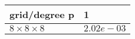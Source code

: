 \begin{tabular}{ll}
\hline
 grid/degree p         & 1          \\
\hline
 $8 \times 8 \times 8$ & $2.02e-03$ \\
\hline
\end{tabular}